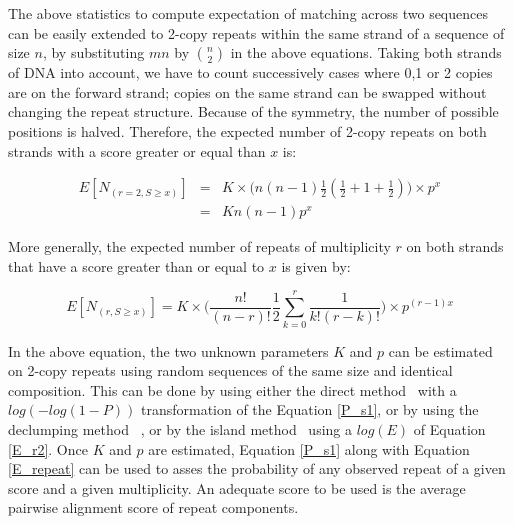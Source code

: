 \documentclass[10pt,journal,letterpaper,compsoc,peerreview]{IEEEtran}
\begin{document}
The above statistics to compute expectation of matching across two sequences can be easily extended to 2-copy repeats within the same strand of a sequence of size $n$, by substituting $mn$ by ${{n}\choose{2}}$ in the above equations. Taking both strands of DNA into account, we have to count successively cases where 0,1 or 2 copies are on the forward strand; copies on the same strand can be swapped without changing the repeat structure. Because of the symmetry, the number of possible positions is halved. Therefore, the expected number of 2-copy repeats on both strands with a score greater or equal than $x$ is:

\begin{eqnarray}
    E[ N_{(r=2, S\geq x)} ]  & = & K \times  \Big( n (n-1) \frac 12 (\frac 1 2 + 1 + \frac 1 2) \Big) \times  p^x \nonumber \\
                                          & = & K  n (n-1)   p^x
    \label{E_r2}
\end{eqnarray}


More generally, the expected number of repeats of multiplicity $r$ on both strands that have a score greater than or equal to $x$ is given by:

\begin{equation}
    E[ N_{(r, S\geq x)} ]   =  K \times  \Big( \frac{n!}{(n-r)! }  \frac 12 \sum_{k=0}^{r}{\frac{1}{k! (r-k)!}} \Big) \times  p^{(r-1)x}
    \label{E_repeat}
\end{equation}

In the above equation, the two unknown parameters $K$ and $p$ can be estimated on 2-copy repeats using random sequences of the same size and identical composition.  This can be done by using either the direct method~\cite{Olsen1999} with a $log(-log(1-P))$ transformation of the Equation \ref{P_s1}, or by using the declumping method ~\cite{Waterman1994}, or by the island method~\cite{Olsen1999} using a $log(E)$ of Equation \ref{E_r2}. Once $K$ and $p$ are estimated, Equation \ref{P_s1} along with Equation \ref{E_repeat} can be used to asses the probability of any observed repeat of a given score and a given multiplicity. An adequate score to be used is the average pairwise alignment score of repeat components.  

\end{document}
